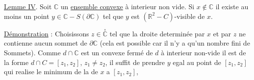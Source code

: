 \uline{Lemme IV}. Soit $\mathbb{C}$ un \uline{ensemble convexe} à interieur non vide. Si $x\notin\mathbb{C}$ il existe au moins un point $y\in\mathbb{C}-S(\partial\mathbb{C})$ tel que $y$ est $(\mathbb{R}^{2}-C)$-visible de $x$.

\uline{Démonstration} : Choisissons $z\in\overset{\circ}{\mathbb{C}}$ tel que la droite determinée par $x$ et par $z$  ne contienne aucun sommet de $\partial\mathbb{C}$ (cela est possible car il n'y a qu'un nombre fini de Sommets). Comme $d\cap\mathbb{C}$ est un convexe fermé de $d$ à interieur  non-vide il est de la forme $d\cap C=[z_{1},z_{2}]$, $z_{1}\ne z_{2}$, il suffit de prendre $y$  egal au point de $[z_{1},z_{2}]$ qui realise le minimum de la  de $x$ a $[z_{1},z_{2}]$, 
\margin{!}

